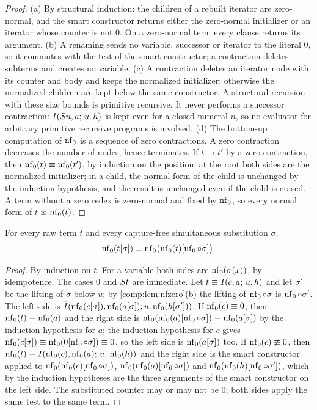 \begin{proof}
(a) By structural induction: the children of a rebuilt iterator are
zero-normal, and the smart constructor returns either the zero-normal
initializer or an iterator whose counter is not $0$. On a zero-normal term
every clause returns its argument. (b) A renaming sends no variable,
successor or iterator to the literal $0$, so it commutes with the test of
the smart constructor; a contraction deletes subterms and creates no
variable. (c) A contraction deletes an iterator node with its counter and
body and keeps the normalized initializer; otherwise the normalized children
are kept below the same constructor. A structural recursion with these size
bounds is primitive recursive. It never performs a successor contraction:
$I(S n,a;\,u.\,h)$ is kept even for a closed numeral $n$, so no
evaluator for arbitrary primitive recursive programs is involved. (d) The
bottom-up computation of $\operatorname{nf}_0$ is a sequence of zero contractions. A zero
contraction decreases the number of nodes, hence terminates. If $t\to t'$
by a zero contraction, then $\operatorname{nf}_0(t)\equiv\operatorname{nf}_0(t')$, by induction on the
position: at the root both sides are the normalized initializer; in a child,
the normal form of the child is unchanged by the induction hypothesis, and
the result is unchanged even if the child is erased. A term without a zero
redex is zero-normal and fixed by $\operatorname{nf}_0$, so every normal form of $t$ is
$\operatorname{nf}_0(t)$.
\end{proof}

\begin{lemma}
\label{comp:lem:nfzerosubst}
For every raw term $t$ and every capture-free simultaneous substitution
$\sigma$,
\[
 \operatorname{nf}_0(t[\sigma])\equiv\operatorname{nf}_0\bigl(\operatorname{nf}_0(t)[\operatorname{nf}_0\circ\sigma]\bigr).
\]
\end{lemma}

\begin{proof}
By induction on $t$. For a variable both sides are $\operatorname{nf}_0(\sigma(x))$, by
idempotence. The cases $0$ and $S t$ are immediate. Let
$t\equiv I(c,a;\,u.\,h)$ and let $\sigma'$ be the lifting of $\sigma$ below
$u$; by \cref{comp:lem:nfzero}(b) the lifting of $\operatorname{nf}_0\circ\sigma$ is
$\operatorname{nf}_0\circ\sigma'$. The left side is
$\overline{I}(\operatorname{nf}_0(c[\sigma]),\operatorname{nf}_0(a[\sigma]);u.\operatorname{nf}_0(h[\sigma']))$. If
$\operatorname{nf}_0(c)\equiv0$, then $\operatorname{nf}_0(t)\equiv\operatorname{nf}_0(a)$ and the right side is
$\operatorname{nf}_0(\operatorname{nf}_0(a)[\operatorname{nf}_0\circ\sigma])\equiv\operatorname{nf}_0(a[\sigma])$ by the induction
hypothesis for $a$; the induction hypothesis for $c$ gives
$\operatorname{nf}_0(c[\sigma])\equiv\operatorname{nf}_0(0[\operatorname{nf}_0\circ\sigma])\equiv0$, so the left side
is $\operatorname{nf}_0(a[\sigma])$ too. If $\operatorname{nf}_0(c)\not\equiv0$, then
$\operatorname{nf}_0(t)\equiv I(\operatorname{nf}_0(c),\operatorname{nf}_0(a);\,u.\,\operatorname{nf}_0(h))$ and the right side is
the smart constructor applied to
$\operatorname{nf}_0(\operatorname{nf}_0(c)[\operatorname{nf}_0\circ\sigma])$, $\operatorname{nf}_0(\operatorname{nf}_0(a)[\operatorname{nf}_0\circ\sigma])$ and
$\operatorname{nf}_0(\operatorname{nf}_0(h)[\operatorname{nf}_0\circ\sigma'])$, which by the induction hypotheses are
the three arguments of the smart constructor on the left side. The
substituted counter may or may not be $0$; both sides apply the same test
to the same term.
\end{proof}

